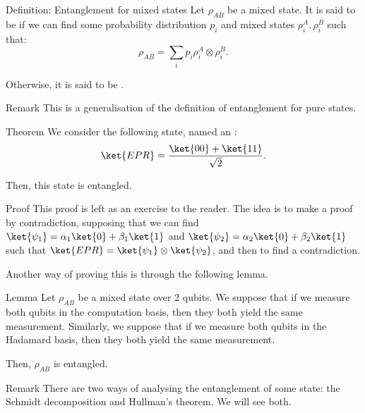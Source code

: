 \documentclass[a4paper]{article}
\begin{document}
\begin{parag}{Definition: Entanglement for mixed states}
    Let $\rho_{AB}$ be a mixed state. It is said to be  if we can find some probability distribution $p_i$ and mixed states $\rho_i^{A}, \rho_i^{B}$ such that: 
    \[\rho_{AB} = \sum_{i} p_i \rho_i^A \otimes \rho_i^B.\]

    Otherwise, it is said to be .
    
    \begin{subparag}{Remark}
        This is a generalisation of the definition of entanglement for pure states.
    \end{subparag}
\end{parag}

\begin{parag}{Theorem}
    We consider the following state, named an : 
    \[\ket{EPR} = \frac{\ket{00} + \ket{11}}{\sqrt{2}}.\]
    
    Then, this state is entangled.

    \begin{subparag}{Proof}
        This proof is left as an exercise to the reader. The idea is to make a proof by contradiction, supposing that we can find $\ket{\psi_1} = \alpha_1 \ket{0} + \beta_1 \ket{1}$ and $\ket{\psi_2} = \alpha_2 \ket{0} + \beta_2 \ket{1}$ such that $\ket{EPR} = \ket{\psi_1} \otimes \ket{\psi_2}$, and then to find a contradiction.

        Another way of proving this is through the following lemma.
    \end{subparag}
\end{parag}

\begin{parag}{Lemma}
    Let $\rho_{AB}$ be a mixed state over 2 qubits. We suppose that if we measure both qubits in the computation basis, then they both yield the same measurement. Similarly, we suppose that if we measure both qubits in the Hadamard basis, then they both yield the same measurement.

    Then, $\rho_{AB}$ is entangled.
\end{parag}

\begin{parag}{Remark}
    There are two ways of analysing the entanglement of some state: the Schmidt decomposition and Hullman's theorem. We will see both.
\end{parag}
\end{document}
